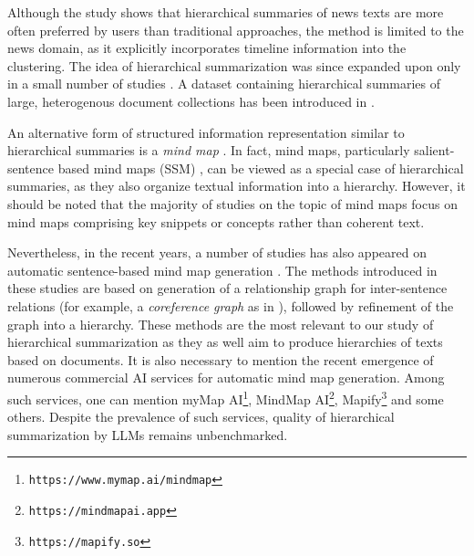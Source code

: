 \documentclass[11pt,a4paper]{article}
\begin{document}
Although the study shows that hierarchical summaries of news texts are more often preferred by users than traditional approaches, the method is limited to the news domain, as it explicitly incorporates timeline information into the clustering. The idea of hierarchical summarization was since expanded upon only in a small number of studies \cite{litvak2020hierarchical, tauchmann2018beyond}. A dataset containing hierarchical summaries of large, heterogenous document collections has been introduced in \cite{tauchmann2018beyond}.

An alternative form of structured information representation similar to hierarchical summaries is a \textit{mind map} \cite{buzan2006use}. In fact, mind maps, particularly salient-sentence based mind maps (SSM) \cite{wei2019revealing}, can be viewed as a special case of hierarchical summaries, as they also organize textual information into a hierarchy. However, it should be noted that the majority of studies on the topic of mind maps focus on mind maps comprising key snippets or concepts rather than coherent text. 

Nevertheless, in the recent years, a number of studies has also appeared on automatic sentence-based mind map generation \cite{wei2019revealing, hu2021efficient, wang2022multidocument, lu2023weekly, zhang2024coreference}. The methods introduced in these studies are based on generation of a relationship graph for inter-sentence relations (for example, a \textit{coreference graph} \cite{xu2020discourse} as in \cite{zhang2024coreference}), followed by refinement of the graph into a hierarchy. These methods are the most relevant to our study of hierarchical summarization as they as well aim to produce hierarchies of texts based on documents. It is also necessary to mention the recent emergence of numerous commercial AI services for automatic mind map generation. Among such services, one can mention myMap AI\footnote{\texttt{https://www.mymap.ai/mindmap}}, MindMap AI\footnote{\texttt{https://mindmapai.app}}, Mapify\footnote{\texttt{https://mapify.so}} and some others. Despite the prevalence of such services, quality of hierarchical summarization by LLMs remains unbenchmarked.


\end{document}
